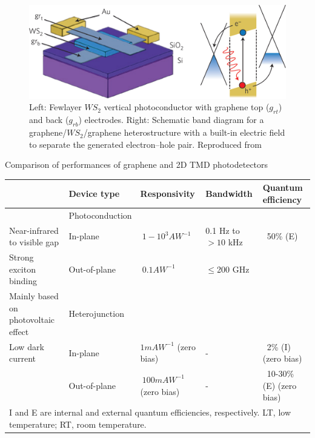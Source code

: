 \begin{figure}[!h]
	\begin{center}
		\includegraphics[scale=0.25]{PhotoconductorDiagram.png}
		\caption{Left: Fewlayer $WS_2$ vertical photoconductor with graphene top ($g_{rt}$) and back ($g_{rb}$) electrodes. Right: Schematic band diagram for a graphene/$WS_2$/graphene heterostructure with a built-in electric field to separate the generated electron–hole pair. Reproduced from \cite{Mak2016}}
		\label{fig:PhotoconductorDiagram}
	\end{center}
\end{figure}

\newpage
\begin{table}[!ht]
	\label{tab:GrapheneTMDCPhotodectorsComparison}
	\caption{Comparison of performances of graphene and 2D TMD photodetectors}
\end{table}

\begin{tiny}
\begin{center}
\begin{tabular}{l|llll}

									& Device type		& Responsivity				& Bandwidth			& Quantum efficiency	\\\hline
									& Photoconduction	& 							&					&						\\	
Near-infrared to visible gap		& In-plane			& $~1-10^3 AW^{-1}$			& 0.1 Hz to $>10$ kHz & ~50\% (E) 			\\
Strong exciton binding				& Out-of-plane		& $~0.1 AW^{-1}$			& $\leq$200 GHz 	& 						\\
Mainly based on photovoltaic effect & Heterojunction 	& 							& 					&						\\
Low dark current					& In-plane			& $1 mAW^{-1}$ (zero bias)	& - 				& ~2\% (I) (zero bias) 	\\
									& Out-of-plane		& $~100 mAW^{-1}$ (zero bias)& -				& ~10-30\% (E) (zero bias) \\\hline
\multicolumn{5}{l}{I and E are internal and external quantum efficiencies, respectively. LT, low temperature; RT, room temperature.}

\end{tabular}
\end{center}
\end{tiny}


